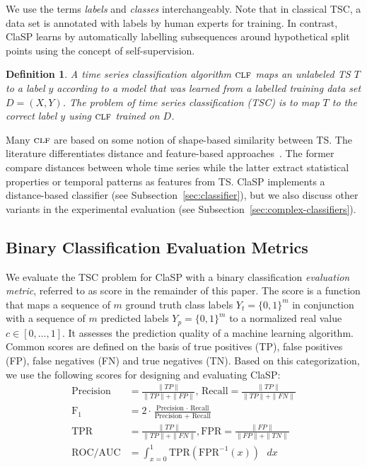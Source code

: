 \documentclass[pdflatex,sn-basic]{sn-jnl}
\newtheorem{definition}{Definition}
\begin{document}
We use the terms \emph{labels} and \emph{classes} interchangeably. Note that in classical TSC, a data set is annotated with labels by human experts for training. In contrast, ClaSP learns by automatically labelling subsequences around hypothetical split points using the concept of self-supervision.

\begin{definition}
A time series classification algorithm $\textsc{clf}$ maps an unlabeled TS $T$ to a label $y$ according to a model that was learned from a labelled training data set $D = (X, Y)$. The problem of time series classification (TSC) is to map $T$ to the correct label $y$ using $\textsc{clf}$ trained on $D$.
\end{definition}

Many $\textsc{clf}$ are based on some notion of shape-based similarity between TS. The literature differentiates distance and feature-based approaches~\citep{bagnall2016great}. The former compare distances between whole time series while the latter extract statistical properties or temporal patterns as features from TS. ClaSP implements a distance-based classifier (see Subsection~\ref{sec:classifier}), but we also discuss other variants in the experimental evaluation (see Subsection~\ref{sec:complex-classifiers}). 


\subsection{Binary Classification Evaluation Metrics}
\label{sec:eval_metrics}

We evaluate the TSC problem for ClaSP with a binary classification \emph{evaluation metric}, referred to as score in the remainder of this paper. The score is a function that maps a sequence of $m$ ground truth class labels $Y_t = \{0,1\}^m$ in conjunction with a sequence of $m$ predicted labels $Y_p = \{0,1\}^m$ to a normalized real value $c \in [0,\dots,1]$. It assesses the prediction quality of a machine learning algorithm. Common scores are defined on the basis of true positives (TP), false positives (FP), false negatives (FN) and true negatives (TN). Based on this categorization, we use the following scores for designing and evaluating ClaSP:
\begin{align}
\text{Precision} &= \frac{\|TP\|}{\|TP\| + \|FP\|} \text{, }
    \text{Recall} = \frac{\|TP\|}{\|TP\| + \|FN\|} \\
    \text{F}_1 &= 2 \cdot \frac{\text{Precision } \cdot \text{ Recall}}{\text{Precision + Recall}} \\
    \text{TPR} &= \frac{\|TP\|}{\|TP\| + \|FN\|}, 
    \text{FPR} = \frac{\|FP\|}{\|FP\| + \|TN\|} \\
    \text{ROC/AUC} &= \int_{x=0}^{1} \mbox{TPR}(\mbox{FPR}^{-1}(x))\text{ } dx 
\end{align}
\end{document}
